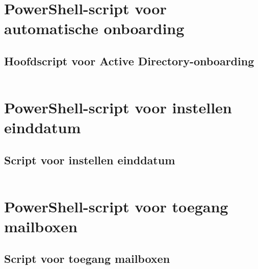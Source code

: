 \documentclass[dutch,dit,thesis]{hogentreport}
\begin{document}









%




\appendix
\chapter{PowerShell-script voor automatische onboarding}

\section{Hoofdscript voor Active Directory-onboarding}

%

\inputminted{powershell}{../scripts/PowerAutomate.ps1}

\chapter{PowerShell-script voor instellen einddatum}

\section{Script voor instellen einddatum}


%

\inputminted{powershell}{../scripts/Enddate.ps1}

\chapter{PowerShell-script voor toegang mailboxen}

\section{Script voor toegang mailboxen}
\end{document}
